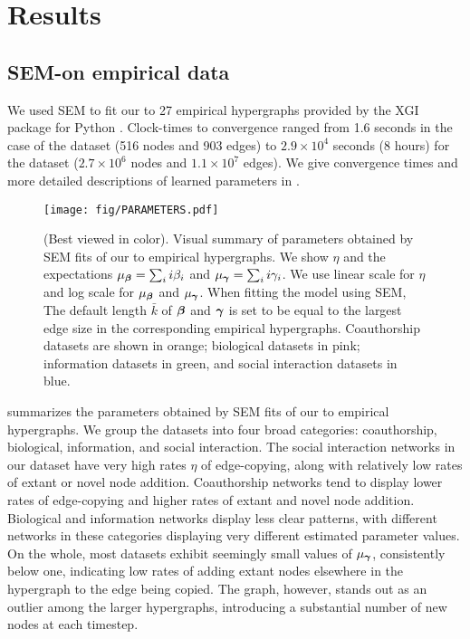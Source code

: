 \section*{Results} \label{sec:results}

\subsection*{SEM-\model on empirical data}
We used SEM to fit our \model to 27 empirical hypergraphs provided by the XGI package for Python \cite{landryXGIPythonPackage2023}. 
Clock-times to convergence ranged from 1.6 seconds in the case of the  dataset (516 nodes and 903 edges) to $2.9\times 10^4$ seconds (8 hours) for the  dataset ($2.7\times 10^6$ nodes and $1.1 \times 10^7$ edges). 
We give convergence times and more detailed descriptions of learned parameters in .  

\begin{figure*}%
    \centering
    \texttt{[image: fig/PARAMETERS.pdf]}
    \caption{
    (Best viewed in color). Visual summary of parameters obtained by SEM fits of our \model to empirical hypergraphs. 
    We show $\eta$ and the expectations $\mu_{\boldsymbol{\beta}} = \sum_{i} i\beta_i$ and $\mu_{\boldsymbol{\gamma}} = \sum_i i \gamma_i$.
    We use linear scale for $\eta$ and log scale for $\mu_{\boldsymbol{\beta}}$ and $\mu_{\boldsymbol{\gamma}}$. 
    When fitting the model using SEM, The default length $\bar{k}$ of $\boldsymbol{\beta}$ and $\boldsymbol{\gamma}$ is set to be equal to the largest edge size in the corresponding empirical hypergraphs. 
    Coauthorship datasets are shown in orange; biological datasets in pink; information datasets in green, and social interaction datasets in blue. 
    }
    \label{fig:parameters}
\end{figure*}

 summarizes the parameters obtained by SEM fits of our \model to empirical hypergraphs.
We group the datasets into four broad categories: coauthorship, biological, information, and social interaction. 
The social interaction networks in our dataset have very high rates $\eta$ of edge-copying, along with relatively low rates of extant or novel node addition. 
Coauthorship networks tend to display lower rates of edge-copying and higher rates of extant and novel node addition. 
Biological and information networks display less clear patterns, with different networks in these categories displaying very different estimated parameter values. 
On the whole, most datasets exhibit seemingly small values of $\mu_{\boldsymbol{\gamma}}$, consistently below one, indicating low rates of adding extant nodes elsewhere in the hypergraph to the edge being copied. The  graph, however, stands out as an outlier among the larger hypergraphs, introducing a substantial number of new nodes at each timestep.   



